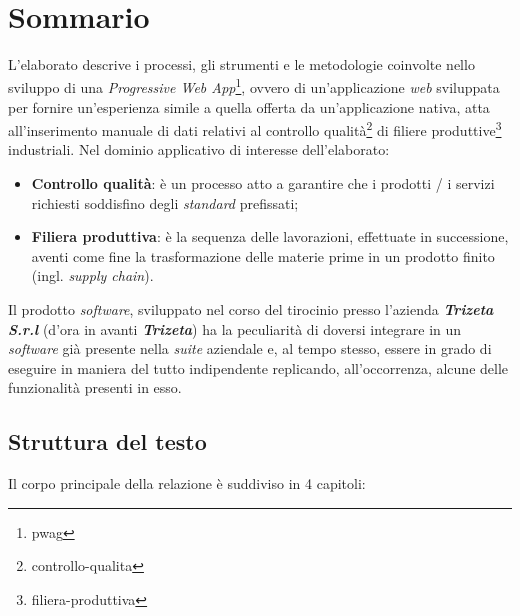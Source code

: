 \newpage \ \thispagestyle{empty} \newpage
\cleardoublepage
{}
{}
\begingroup
\let\clearpage\relax
\let\cleardoublepage\relax
\let\cleardoublepage\relax

\chapter*{Sommario}
L'elaborato descrive i processi, gli strumenti e le metodologie coinvolte nello sviluppo di una \textit{Progressive Web App}\footnote{\gls{pwag}}, ovvero di un'applicazione \textit{web} sviluppata per fornire un'esperienza simile a quella offerta da un'applicazione nativa, 
atta all'inserimento manuale di dati relativi al controllo qualità\footnote{\gls{controllo-qualita}} di filiere produttive\footnote{\gls{filiera-produttiva}} industriali. 
\newline
Nel dominio applicativo di interesse dell'elaborato:
\begin{itemize}
    \item \textbf{Controllo qualità}: è un processo atto a garantire che i prodotti / i servizi richiesti soddisfino degli \textit{standard} prefissati;
    \item \textbf{Filiera produttiva}: è la sequenza delle lavorazioni, effettuate in successione, aventi come fine la trasformazione delle materie prime in un prodotto finito (ingl. \textit{supply chain}).
\end{itemize} 
Il prodotto \textit{software}, sviluppato nel corso del tirocinio presso l'azienda \textit{\textbf{Trizeta S.r.l}} (d'ora in avanti \textit{\textbf{Trizeta}}) ha la peculiarità di doversi integrare in un \textit{software} già presente nella \textit{suite} aziendale e, al tempo stesso, essere in grado di eseguire in maniera del tutto indipendente replicando, all'occorrenza, alcune delle funzionalità presenti in esso.

\section*{Struttura del testo}
Il corpo principale della relazione è suddiviso in 4 capitoli:

